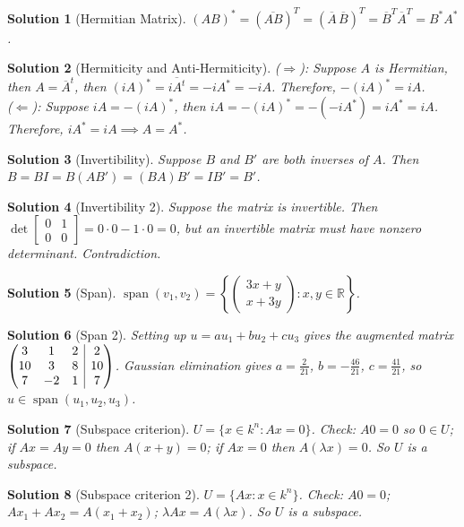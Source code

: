 \documentclass{article}
\makeatletter
\newtheorem{solution}{Solution}
\newcommand{\Span}{\operatorname{span}}
\newenvironment{amatrix}[1]{%
  \left(\begin{array}{@{}*{#1}{c}|c@{}}
}{%
  \end{array}\right)
}
\makeatother
\begin{document}
\begin{solution}[Hermitian Matrix]
    $(AB)^\ast = (\overline{AB})^T = (\overline{A}\,\overline{B})^T = \overline{B}^T\overline{A}^T = B^\ast A^\ast$.
\end{solution}
\begin{solution}[Hermiticity and Anti-Hermiticity]
    ($\Rightarrow$): Suppose $A$ is Hermitian, then $A=\overline{A}^t$, then $(iA)^\ast = \overline{iA^t} = -iA^\ast = -iA$. Therefore, $-(iA)^\ast = iA$.\\
    ($\Leftarrow$): Suppose $iA = -(iA)^\ast$, then $iA = -(iA)^\ast = -(-iA^\ast) = iA^\ast = iA$. Therefore, $iA^\ast = iA \implies A = A^\ast$.
\end{solution}
\begin{solution}[Invertibility]
    Suppose $B$ and $B'$ are both inverses of $A$. Then $B = BI = B(AB') = (BA)B' = IB' = B'$.
\end{solution}
\begin{solution}[Invertibility 2]
    Suppose the matrix is invertible. Then $\det\begin{bmatrix}0&1\\0&0\end{bmatrix} = 0\cdot0-1\cdot0 = 0$, but an invertible matrix must have nonzero determinant. Contradiction.
\end{solution}
\begin{solution}[Span]
    $\Span(v_1,v_2) = \left\{\begin{pmatrix}3x+y\\x+3y\end{pmatrix}: x,y\in\mathbb{R}\right\}$.
\end{solution}
\begin{solution}[Span 2]
    Setting up $u=au_1+bu_2+cu_3$ gives the augmented matrix $\begin{amatrix}{3}3&1&2&2\\10&3&8&10\\7&-2&1&7\end{amatrix}$. Gaussian elimination gives $a=\frac{2}{21}$, $b=-\frac{46}{21}$, $c=\frac{41}{21}$, so $u\in\Span(u_1,u_2,u_3)$.
\end{solution}
\begin{solution}[Subspace criterion]
    $U=\{x\in k^n:Ax=0\}$. Check: $A0=0$ so $0\in U$; if $Ax=Ay=0$ then $A(x+y)=0$; if $Ax=0$ then $A(\lambda x)=0$. So $U$ is a subspace.
\end{solution}
\begin{solution}[Subspace criterion 2]
    $U=\{Ax:x\in k^n\}$. Check: $A0=0$; $Ax_1+Ax_2=A(x_1+x_2)$; $\lambda Ax = A(\lambda x)$. So $U$ is a subspace.
\end{solution}
\end{document}
